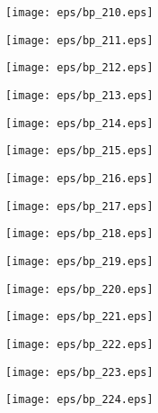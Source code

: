 \documentclass{book}
\begin{document}
	\clearpage\begin{figure}[p]
    \centering
	\texttt{[image: eps/bp\_210.eps]}
	\end{figure}
	\clearpage\begin{figure}[p]
    \centering
	\texttt{[image: eps/bp\_211.eps]}
	\end{figure}
	\clearpage\begin{figure}[p]
    \centering
	\texttt{[image: eps/bp\_212.eps]}
	\end{figure}
	\clearpage\begin{figure}[p]
    \centering
	\texttt{[image: eps/bp\_213.eps]}
	\end{figure}
	\clearpage\begin{figure}[p]
    \centering
	\texttt{[image: eps/bp\_214.eps]}
	\end{figure}
	\clearpage\begin{figure}[p]
    \centering
	\texttt{[image: eps/bp\_215.eps]}
	\end{figure}
	\clearpage\begin{figure}[p]
    \centering
	\texttt{[image: eps/bp\_216.eps]}
	\end{figure}
	\clearpage\begin{figure}[p]
    \centering
	\texttt{[image: eps/bp\_217.eps]}
	\end{figure}
	\clearpage\begin{figure}[p]
    \centering
	\texttt{[image: eps/bp\_218.eps]}
	\end{figure}
	\clearpage\begin{figure}[p]
    \centering
	\texttt{[image: eps/bp\_219.eps]}
	\end{figure}
	\clearpage\begin{figure}[p]
    \centering
	\texttt{[image: eps/bp\_220.eps]}
	\end{figure}
	\clearpage\begin{figure}[p]
    \centering
	\texttt{[image: eps/bp\_221.eps]}
	\end{figure}
	\clearpage\begin{figure}[p]
    \centering
	\texttt{[image: eps/bp\_222.eps]}
	\end{figure}
	\clearpage\begin{figure}[p]
    \centering
	\texttt{[image: eps/bp\_223.eps]}
	\end{figure}
	\clearpage\begin{figure}[p]
    \centering
	\texttt{[image: eps/bp\_224.eps]}
	\end{figure}
\end{document}
